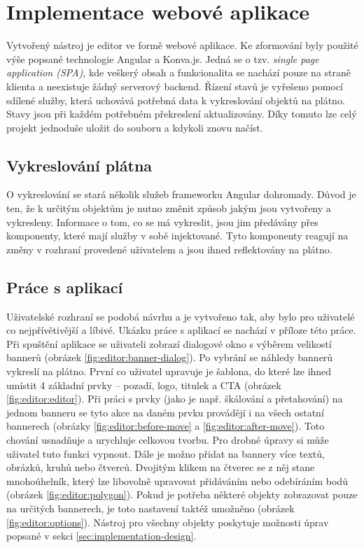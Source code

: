 \chapter{Implementace webové aplikace}
\label{chap:implementation}

Vytvořený nástroj je editor ve formě webové aplikace. Ke zformování byly použité výše popsané technologie Angular a Konva.js. 
Jedná se o tzv. \emph{single page application (SPA)}, kde veškerý obsah a funkcionalita se nachází pouze na straně klienta a neexistuje žádný
serverový backend. Řízení stavů je vyřešeno pomocí sdílené služby, která uchovává potřebná data k vykreslování objektů na plátno.
Stavy jsou při každém potřebném překreslení aktualizovány. Díky tomuto lze celý projekt jednoduše uložit do souboru a kdykoli znovu načíst.
    
\section{Vykreslování plátna}
    O vykreslování se stará několik služeb frameworku Angular dohromady. Důvod je ten, že k určitým objektům je nutno změnit způsob jakým jsou vytvořeny a vykresleny.
    Informace o tom, co se má vykreslit, jsou jim předávány přes komponenty, které mají služby v sobě injektované. Tyto komponenty reagují
    na změny v rozhraní provedené uživatelem a jsou ihned reflektovány na plátno.

\section{Práce s aplikací}
    Uživatelské rozhraní se podobá návrhu a je vytvořeno tak, aby bylo pro uživatelé co nejpřívětivější a líbivé.
    Ukázku práce s aplikací se nachází v příloze této práce.
    Při spuštění aplikace se uživateli zobrazí dialogové okno s výběrem velikostí bannerů (obrázek \ref{fig:editor:banner-dialog}). Po vybrání se náhledy bannerů vykreslí na plátno.
    První co uživatel upravuje je šablona, do které lze ihned umístit 4 základní prvky -- pozadí, logo, titulek a CTA (obrázek \ref{fig:editor:editor}).
    Při práci s prvky (jako je např. škálování a přetahování) na jednom banneru
    se tyto akce na daném prvku provádějí i na všech ostatní bannerech (obrázky \ref{fig:editor:before-move} a \ref{fig:editor:after-move}).
    Toto chování usnadňuje a urychluje celkovou tvorbu.
    Pro drobné úpravy si může uživatel tuto funkci vypnout.
    Dále je možno přidat na bannery více textů, obrázků, kruhů nebo čtverců. Dvojitým klikem na čtverec se z něj stane mnohoúhelník, který lze libovolně upravovat
    přidáváním nebo odebíráním bodů (obrázek \ref{fig:editor:polygon}). Pokud je potřeba některé objekty zobrazovat pouze na určitých bannerech, je toto nastavení taktéž umožněno (obrázek \ref{fig:editor:options}).
    Nástroj pro všechny objekty poskytuje možnosti úprav popsané v sekci \ref{sec:implementation-design}.

